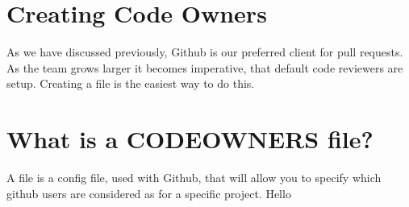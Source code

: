 \maketitle{}
\section{ Creating Code Owners }

As we have discussed previously, Github is our preferred client for pull
requests. As the team grows larger it becomes imperative, that default code
reviewers are setup. Creating a \codeowners{} file is the easiest way to do this.

\section{ What is a CODEOWNERS file? }
A \codeowners{} file is a config file, used with Github, that will allow you to
specify which github users are considered as \codeowners{} for a specific project.
Hello
